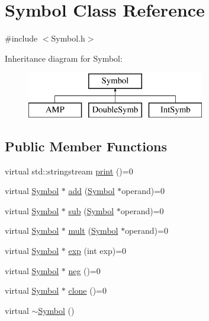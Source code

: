 \hypertarget{class_symbol}{\section{Symbol Class Reference}
\label{class_symbol}
}


{\ttfamily \#include $<$Symbol.\+h$>$}

Inheritance diagram for Symbol\+:\begin{figure}[H]
\begin{center}
\leavevmode
\includegraphics[height=2.000000cm]{class_symbol}
\end{center}
\end{figure}
\subsection*{Public Member Functions}
\begin{DoxyCompactItemize}
\item 
virtual std\+::stringstream \hyperlink{class_symbol_a327d7b38b13102918bab2a09b8b6a303}{print} ()=0
\item 
virtual \hyperlink{class_symbol}{Symbol} $\ast$ \hyperlink{class_symbol_ae8aeeef72df9b6c8f32197e97b909c72}{add} (\hyperlink{class_symbol}{Symbol} $\ast$operand)=0
\item 
virtual \hyperlink{class_symbol}{Symbol} $\ast$ \hyperlink{class_symbol_a53b98ce639c66d1b2e73992f20f56c54}{sub} (\hyperlink{class_symbol}{Symbol} $\ast$operand)=0
\item 
virtual \hyperlink{class_symbol}{Symbol} $\ast$ \hyperlink{class_symbol_a224ae5c870650b7704756d8279b9bc53}{mult} (\hyperlink{class_symbol}{Symbol} $\ast$operand)=0
\item 
virtual \hyperlink{class_symbol}{Symbol} $\ast$ \hyperlink{class_symbol_aa259102d6727f267c718b91c78e5eb46}{exp} (int exp)=0
\item 
virtual \hyperlink{class_symbol}{Symbol} $\ast$ \hyperlink{class_symbol_acfc77f36fef51f4d300896d0e5183986}{neg} ()=0
\item 
virtual \hyperlink{class_symbol}{Symbol} $\ast$ \hyperlink{class_symbol_a642df9ea636eb1b7fafa11fc539ea49a}{clone} ()=0
\item 
virtual \hyperlink{class_symbol_a0f129c4040fac10b29e9e9a3cddb2e69}{$\sim$\+Symbol} ()
\end{DoxyCompactItemize}

